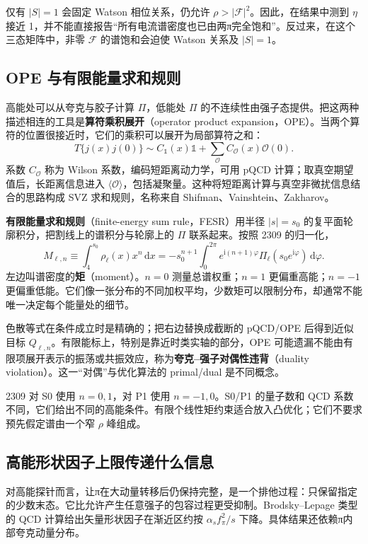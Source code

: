 \documentclass[UTF8,a4paper,11pt,fontset=fandol]{ctexart}
\numberwithin{equation}{section}
\newcommand{\dd}{\,\mathrm d}
\newcommand{\ii}{\mathrm i}
\newcommand{\Fcal}{\mathcal F}
\begin{document}
仅有 \(|S|=1\) 会固定 Watson 相位关系，仍允许 \(\rho>|\Fcal|^2\)。因此，在结果中测到 \(\eta\) 接近 1，并不能直接报告“所有电流谱密度也已由两π完全饱和”。反过来，在这个三态矩阵中，非零 \(\Fcal\) 的谱饱和会迫使 Watson 关系及 \(|S|=1\)。

\subsection{OPE 与有限能量求和规则}
高能处可以从夸克与胶子计算 \(\Pi\)，低能处 \(\Pi\) 的不连续性由强子态提供。把这两种描述相连的工具是\textbf{算符乘积展开}（operator product expansion，OPE）。当两个算符的位置很接近时，它们的乘积可以展开为局部算符之和：
\begin{equation}
T\{j(x)j(0)\}\sim C_{\mathbb1}(x)\mathbb1+
\sum_{\mathcal O}C_{\mathcal O}(x)\mathcal O(0).
\end{equation}
系数 \(C_{\mathcal O}\) 称为 Wilson 系数，编码短距离动力学，可用 pQCD 计算；取真空期望值后，长距离信息进入 \(\langle\mathcal O\rangle\)，包括凝聚量。这种将短距离计算与真空非微扰信息结合的思路构成 SVZ 求和规则，名称来自 Shifman、Vainshtein、Zakharov。

\textbf{有限能量求和规则}（finite-energy sum rule，FESR）用半径 \(|s|=s_0\) 的复平面轮廓积分，把割线上的谱积分与轮廓上的 \(\Pi\) 联系起来。按照 2309 的归一化，
\begin{equation}\label{eq:FESR}
M_{\ell,n}\equiv\int_4^{s_0}\rho_\ell(x)x^n\dd x
=-s_0^{n+1}\int_0^{2\pi}e^{\ii(n+1)\varphi}
\Pi_\ell(s_0e^{\ii\varphi})\dd\varphi.
\end{equation}
左边叫谱密度的\textbf{矩}（moment）。\(n=0\) 测量总谱权重；\(n=1\) 更偏重高能；\(n=-1\) 更偏重低能。它们像一张分布的不同加权平均，少数矩可以限制分布，却通常不能唯一决定每个能量处的细节。

色散等式在条件成立时是精确的；把右边替换成截断的 pQCD/OPE 后得到近似目标 \(Q_{\ell,n}\)。有限能标上，特别是靠近时类实轴的部分，OPE 可能遗漏不能由有限项展开表示的振荡或共振效应，称为\textbf{夸克--强子对偶性违背}（duality violation）。这一“对偶”与优化算法的 primal/dual 是不同概念。

2309 对 S0 使用 \(n=0,1\)，对 P1 使用 \(n=-1,0\)。S0/P1 的量子数和 QCD 系数不同，它们给出不同的高能条件。有限个线性矩约束适合放入凸优化；它们不要求预先假定谱由一个窄 \(\rho\) 峰组成。

\subsection{高能形状因子上限传递什么信息}
对高能探针而言，让π在大动量转移后仍保持完整，是一个排他过程：只保留指定的少数末态。它比允许产生任意强子的包容过程更受抑制。Brodsky--Lepage 类型的 QCD 计算给出矢量形状因子在渐近区约按 \(\alpha_s f_\pi^2/s\) 下降。具体结果还依赖π内部夸克动量分布。
\end{document}
